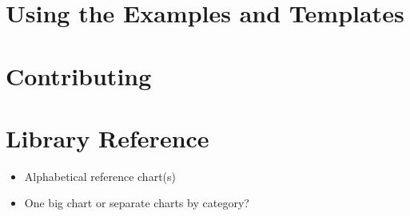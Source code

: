 \documentclass[%
	11pt,
	a4paper,
	DIV=13]{scrbook}
\begin{document}
\chapter{Using the Examples and Templates}



\chapter{Contributing}



\chapter{Library Reference}
\begin{itemize}
\item Alphabetical reference chart(s)
\item One big chart or separate charts by category?
\end{itemize}
\end{document}

